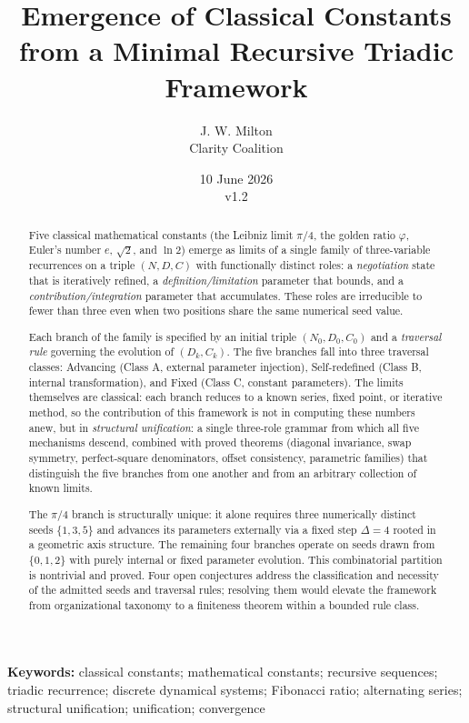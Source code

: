 \documentclass[12pt]{article}
\title{Emergence of Classical Constants from a Minimal Recursive Triadic Framework}
\author{J. W. Milton\\[4pt]{\small Clarity Coalition}}
\date{\small 10 June 2026 \\ v1.2}
\begin{document}
\maketitle

\noindent\textbf{Keywords:} classical constants; mathematical constants; recursive sequences; triadic recurrence; discrete dynamical systems; Fibonacci ratio; alternating series; structural unification; unification; convergence

\begin{abstract}
Five classical mathematical constants (the Leibniz limit \(\pi/4\), the
golden ratio \(\varphi\), Euler's number \(e\), \(\sqrt{2}\), and
\(\ln 2\)) emerge as limits of a single family of three-variable
recurrences on a triple \((N, D, C)\) with functionally distinct roles:
a \emph{negotiation} state that is iteratively refined, a
\emph{definition/limitation} parameter that bounds, and a
\emph{contribution/integration} parameter that accumulates. These roles
are irreducible to fewer than three even when two positions share the
same numerical seed value.

Each branch of the family is specified by an initial triple
\((N_0, D_0, C_0)\) and a \emph{traversal rule} governing the evolution
of \((D_k, C_k)\). The five branches fall into three traversal classes:
Advancing (Class A, external parameter injection), Self-redefined (Class
B, internal transformation), and Fixed (Class C, constant parameters).
The limits themselves are classical: each branch reduces to a known
series, fixed point, or iterative method, so the contribution of this
framework is not in computing these numbers anew, but in
\emph{structural unification}: a single three-role grammar from which
all five mechanisms descend, combined with proved theorems (diagonal
invariance, swap symmetry, perfect-square denominators, offset
consistency, parametric families) that distinguish the five branches
from one another and from an arbitrary collection of known limits.

The \(\pi/4\) branch is structurally unique: it alone requires three
numerically distinct seeds \(\{1, 3, 5\}\) and advances its parameters
externally via a fixed step \(\Delta = 4\) rooted in a geometric axis
structure. The remaining four branches operate on seeds drawn from
\(\{0, 1, 2\}\) with purely internal or fixed parameter evolution. This
combinatorial partition is nontrivial and proved. Four open conjectures
address the classification and necessity of the admitted seeds and
traversal rules; resolving them would elevate the framework from
organizational taxonomy to a finiteness theorem within a bounded rule
class.
\end{abstract}
\end{document}
